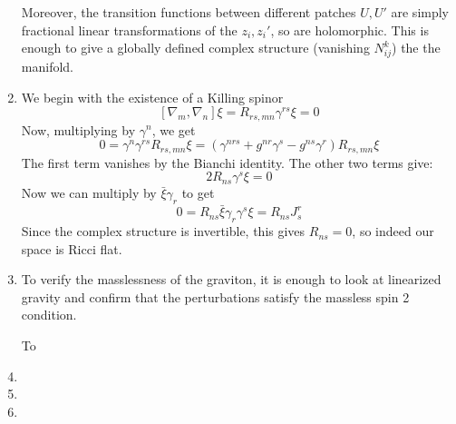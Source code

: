 \documentclass[11pt, class=article, crop=false]{standalone}
\begin{document}
\begin{enumerate}
	Moreover, the transition functions between different patches $U, U'$ are simply fractional linear transformations of the $z_i, z_i'$, so are holomorphic. This is enough to give a globally defined complex structure (vanishing $N_{ij}^k$) the the manifold. 
	
	\item We begin with the existence of a Killing spinor 
	\[
		[\nabla_m, \nabla_n]\xi = R_{rs, mn} \gamma^{rs} \xi  =0
	\]
	Now, multiplying by $\gamma^n$, we get
	\[
		0 = \gamma^{n} \gamma^{rs} R_{rs, mn} \xi = (\gamma^{nrs} + g^{nr} \gamma^s - g^{ns} \gamma^r) R_{rs, mn} \xi 
	\]
	The first term vanishes by the Bianchi identity. The other two terms give:
	\[
		2 R_{ns} \gamma^s \xi = 0
	\]
	Now we can multiply by $\bar \xi \gamma_r$ to get
	\[
		0 = R_{ns} \bar \xi \gamma_r \gamma^s \xi = R_{ns} J^r_s
	\]
	Since the complex structure is invertible, this gives $R_{ns} = 0$, so indeed our space is Ricci flat.
	
	\item To verify the masslessness of the graviton, it is enough to look at linearized gravity and confirm that the perturbations satisfy the massless spin 2 condition. 
	
	To
	
	\item 
	
	\item 
	
	\item 
	
	
	
\end{enumerate}

\end{document}
